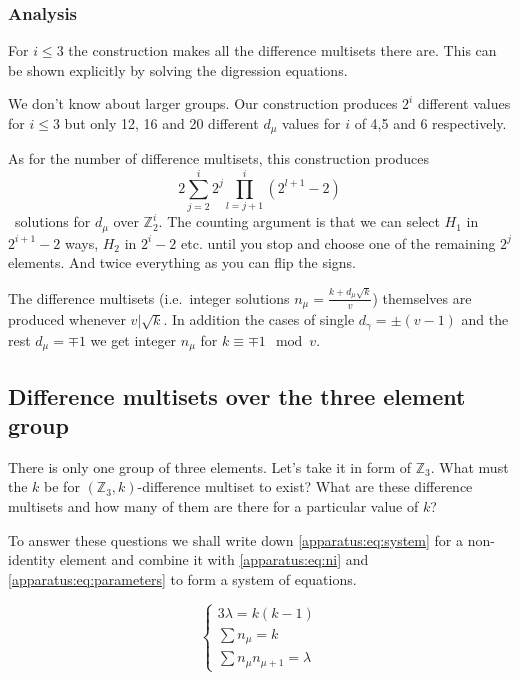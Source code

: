     \subsubsection{Analysis}
        For $i \leq 3$ the construction makes all the difference multisets there are. This can be shown explicitly by solving the digression equations.
        
        We don't know about larger groups. Our construction produces $2^i$ different values for $i \leq 3$ but only 12, 16 and 20 different $d_\mu$ values for $i$ of 4,5 and 6 respectively.
        
        As for the number of difference multisets, this construction produces
        \begin{equation}
            2 \sum\limits_{j=2}^i 2^j \prod\limits_{l=j+1}^i (2^{l+1}-2)
        \end{equation}\
        solutions for $d_\mu$ over $\mathbb Z_2^i$. The counting argument is that we can select $H_1$ in $2^{i+1}-2$ ways, $H_2$ in $2^i-2$ etc. until you stop and choose one of the remaining $2^j$ elements. And twice everything as you can flip the signs.
        
        The difference multisets (i.e.\ integer solutions $n_\mu=\frac{k+d_\mu \sqrt k}v$) themselves are produced whenever $v | \sqrt k$. In addition the cases of single $d_\gamma = \pm (v-1)$ and the rest $d_\mu = \mp 1$ we get integer $n_\mu$ for $k \equiv \mp 1 \mod v$.
        
\subsection{Difference multisets over the three element group}
    \label{sec:z3}
    There is only one group of three elements. Let's take it in form of $\mathbb Z_3$. What must the $k$ be for $(\mathbb Z_3,k)$-difference multiset to exist? What are these difference multisets and how many of them are there for a particular value of $k$?

    To answer these questions we shall write down \eqref{apparatus:eq:system} for a non-identity element and combine it with \eqref{apparatus:eq:ni} and \eqref{apparatus:eq:parameters} to form a system of equations.

    \begin{equation}
        \label{v3:eq:constraints}
        \begin{cases}
            3\lambda = k(k-1) \\
            \sum n_\mu = k \\
            \sum n_\mu n_{\mu+1} = \lambda
        \end{cases}
    \end{equation}

